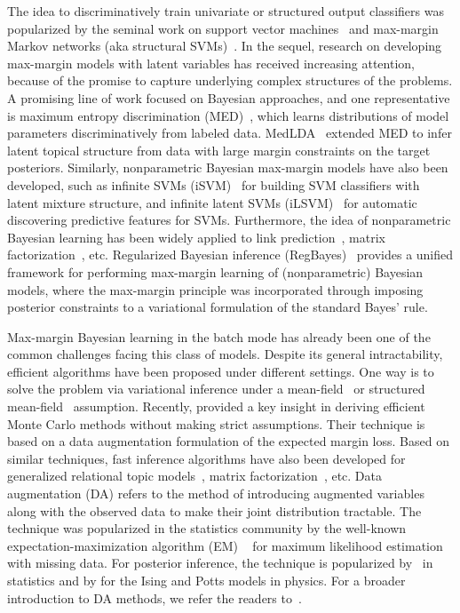 \documentclass[twoside,11pt]{article}
\newcommand{\strin}[1]{\todo[size=\small, color=green!40]{\bf\sf  #1}}
\begin{document}
The idea to discriminatively train univariate or structured output classifiers was popularized by the seminal work on support vector machines~\citep{Vapnik:95} and max-margin Markov networks (aka structural SVMs)~\citep{koller2003max}. In the sequel, research on developing max-margin models with latent variables has received increasing attention, because of the promise to capture underlying complex structures of the problems. A promising line of work focused on Bayesian approaches, and one representative is maximum entropy discrimination (MED)~\citep{jaakkola1999maximum,jebara2001discriminative,Zhu:jmlr09}, which learns distributions of model parameters discriminatively from labeled data. MedLDA~\citep{zhu2012medlda} extended MED to infer latent topical structure from data with large margin constraints on the target posteriors. Similarly, nonparametric Bayesian max-margin models have also been developed, such as infinite SVMs (iSVM)~\citep{zhu2011infinite} for building SVM classifiers with latent mixture structure, and infinite latent SVMs (iLSVM)~\citep{zhu2013bayesian} for automatic discovering predictive features for SVMs. Furthermore, the idea of nonparametric Bayesian learning has been widely applied to link prediction~\citep{zhu2012maxlink}, matrix factorization~\citep{xu2013fast}, etc. Regularized Bayesian inference (RegBayes)~\citep{zhu2013bayesian} provides a unified framework for performing max-margin learning of (nonparametric) Bayesian models, where the max-margin principle was incorporated through imposing posterior constraints to a variational formulation of the standard Bayes' rule.

Max-margin Bayesian learning in the batch mode has already been one of the common challenges facing this class of models. Despite its general intractability, efficient algorithms have been proposed under different settings. One way is to solve the problem via variational inference under a mean-field~\citep{zhu2012medlda} or structured mean-field~\citep{jiang2012monte} assumption. Recently, \cite{zhugibbs2013} provided a key insight in deriving efficient Monte Carlo methods without making strict assumptions. Their technique is based on a data augmentation formulation of the expected margin loss. Based on similar techniques, fast inference algorithms have also been developed for generalized relational topic models~\citep{chen2013generalized}, matrix factorization~\citep{xu2013fast}, etc. Data augmentation (DA) refers to the method of introducing augmented variables along with the observed data to make their joint distribution tractable. The technique was popularized in the statistics community by the well-known expectation-maximization algorithm (EM) ~\citep{dempster1977maximum} for maximum likelihood estimation with missing data. For posterior inference, the technique is popularized by~\cite{tanner1987calculation} in statistics and by \cite{swendsen1987nonuniversal} for the Ising and Potts models in physics. For a broader introduction to DA methods, we refer the readers to~\cite{van2001art}.
\end{document}
